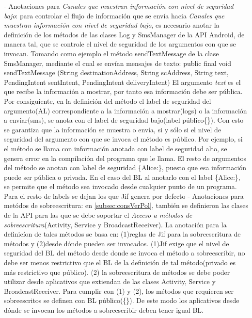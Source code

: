 - Anotaciones para \textit{Canales que muestran información con nivel de
seguridad bajo}: para controlar el flujo de información que se envía hacia
\textit{Canales que muestran información con nivel de seguridad bajo}, es
necesario anotar la definición de los métodos de las clases Log y SmsManager de
la API Android, de manera tal, que se controle el nivel de seguridad de los
argumentos con que se invocan.\newline
Tomando como ejemplo el método sendTextMessage de la clase SmsManager, mediante
el cual se envían mensajes de texto:\newline
public final void sendTextMessage (String destinationAddress, String
scAddress, String text, PendingIntent sentIntent, PendingIntent
deliveryIntent)\newline
El argumento \emph{text} es el que recibe la información a mostrar, por tanto
esa información debe ser pública.\newline 
Por consiguiente, en la definición del método el label de seguridad del
argumento(AL) correspondiente a la información a mostrar(logs) o la información
a enviar(sms), se anota con el label de seguridad bajo(label público\{\}). Con
esto se garantiza que la información se muestra o envía, si y sólo si el nivel
de seguridad del argumento con que se invoca el método es público. Por ejemplo,
si el método se llama con información anotada con label de seguridad alto, se
genera error en la compilación del programa que le llama.\newline 
El resto de argumentos del método se anotan con label de seguridad \{Alice:\},
puesto que esa información puede ser pública o privada.\newline
En el caso del BL al anotarlo con el label \{Alice:\}, se permite que el método
sea invocado desde cualquier punto de un programa. 
Para el resto de labels se dejan los que Jif genera por defecto\newline
- Anotaciones para metódos de sobreescritura: en \ref{subsec:consVerPol},
también se definieron las clases de la API para las que se debe soportar el
\textit{Acceso a métodos de sobreescritura}(Activity, Service y
BroadcastReceiver). La anotación para la definicíon de tales métodos se basa en:
(1)reglas de Jif para la sobreescritura de métodos y (2)desde dónde pueden ser
invocados. (1)Jif exige que el nivel de seguridad del BL del método desde donde
se invoca el método a sobreescribir, no debe ser menos restrictivo que el BL de
la definición de tal método(privado es más restrictivo que público). (2) la
sobreescritura de métodos se debe poder utilizar desde aplicativos que extiendan
de las clases Activity, Service y BroadcastReceiver.\newline 
Para cumplir con (1) y (2), los métodos que requieren ser sobreescritos se
definen con BL público(\{\}). De este modo los aplicativos desde dónde se
invocan los métodos a sobreescribir deben tener igual BL.

